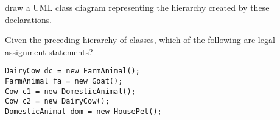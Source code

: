 \begin{EXRtwo}
\noindent draw a UML class diagram representing the hierarchy
created by these \mbox{declarations.}

\item Given the preceding hierarchy of classes, which of the following
are legal assignment statements?

\begin{jjjlisting}
\begin{lstlisting}
DairyCow dc = new FarmAnimal();
FarmAnimal fa = new Goat();
Cow c1 = new DomesticAnimal();
Cow c2 = new DairyCow();
DomesticAnimal dom = new HousePet();
\end{lstlisting}
\end{jjjlisting}

\end{EXRtwo}
%














